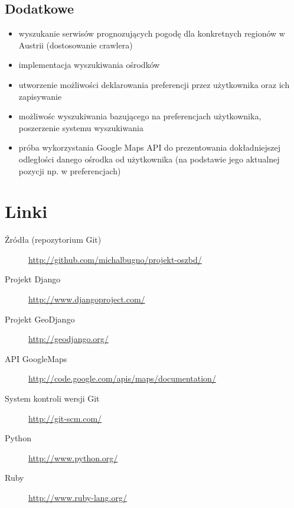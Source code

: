 \documentclass[12pt]{article}
\begin{document}
\subsection{Dodatkowe}
\begin{itemize}
  \item wyszukanie serwisów prognozujących pogodę dla konkretnych regionów w Austrii (dostosowanie crawlera)
  \item implementacja wyszukiwania ośrodków
  \item utworzenie możliwości deklarowania preferencji przez użytkownika oraz ich zapisywanie
  \item możliwośc wyszukiwania bazującego na preferencjach użytkownika, poszerzenie systemu wyszukiwania
  \item próba wykorzystania Google Maps API do prezentowania dokładniejszej odległości danego ośrodka od
        użytkownika (na podstawie jego aktualnej pozycji np. w preferencjach)
\end{itemize}

\section{Linki}
\begin{description}
  \item[Źródła (repozytorium Git)] \url{http://github.com/michalbugno/projekt-oszbd/}
  \item[Projekt Django] \url{http://www.djangoproject.com/}
  \item[Projekt GeoDjango] \url{http://geodjango.org/}
  \item[API GoogleMaps] \url{http://code.google.com/apis/maps/documentation/}
  \item[System kontroli wersji Git] \url{http://git-scm.com/}
  \item[Python] \url{http://www.python.org/}
  \item[Ruby] \url{http://www.ruby-lang.org/}
\end{description}
\end{document}
